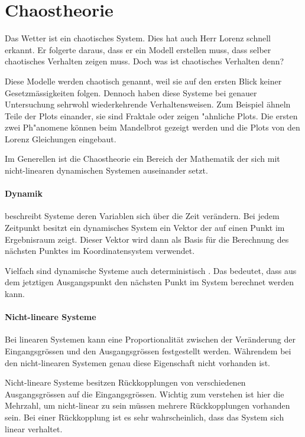 \documentclass[chaostheorie/chaostheorie.tex]{subfiles}
\begin{document}
	\section{Chaostheorie}
	Das Wetter ist ein chaotisches System. Dies hat auch Herr Lorenz schnell erkannt. Er folgerte daraus, dass er ein Modell erstellen muss, dass selber chaotisches Verhalten zeigen muss. Doch was ist chaotisches Verhalten denn?
	
	Diese Modelle werden chaotisch genannt, weil sie auf den ersten Blick keiner Gesetzmässigkeiten folgen. Dennoch haben diese Systeme bei genauer Untersuchung sehrwohl wiederkehrende Verhaltensweisen. Zum Beispiel ähneln Teile der Plots einander, sie sind Fraktale oder zeigen "ahnliche Plots. Die ersten zwei Ph"anomene können beim Mandelbrot gezeigt werden \cite{Gleick} und die Plots von den Lorenz Gleichungen eingebaut.
	
	Im Generellen ist die Chaostheorie ein Bereich der Mathematik der sich mit nicht-linearen dynamischen Systemen auseinander setzt.
	
	\paragraph{Dynamik} beschreibt Systeme deren Variablen sich über die Zeit verändern. Bei jedem Zeitpunkt besitzt ein dynamisches System ein Vektor der auf einen Punkt im Ergebnisraum zeigt. Dieser Vektor wird dann als Basis für die Berechnung des nächsten Punktes im Koordinatensystem verwendet.
	
	Vielfach sind dynamische Systeme auch deterministisch \cite{https://en.wikipedia.org/wiki/Dynamical_system}. Das bedeutet, dass aus dem jetztigen Ausgangspunkt den nächsten Punkt im System berechnet werden kann.
	
	
	\paragraph{Nicht-lineare Systeme} %
	Bei linearen Systemen kann eine Proportionalität zwischen der Veränderung der Eingangsgrössen und den Ausgangsgrössen festgestellt werden. Währendem bei den nicht-linearen Systemen genau diese Eigenschaft nicht vorhanden ist.
	
	Nicht-lineare Systeme besitzen Rückkopplungen von verschiedenen Ausgangsgrössen auf die Eingangsgrössen. Wichtig zum verstehen ist hier die Mehrzahl, um nicht-linear zu sein müssen mehrere Rückkopplungen vorhanden sein. Bei einer Rückkopplung ist es sehr wahrscheinlich, dass das System sich linear verhaltet.
	
\end{document}
